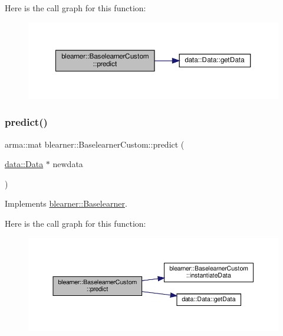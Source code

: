 Here is the call graph for this function\+:
\nopagebreak
\begin{figure}[H]
\begin{center}
\leavevmode
\includegraphics[width=350pt]{classblearner_1_1_baselearner_custom_a7d9640dbb9a118b77735cf79a5850652_cgraph}
\end{center}
\end{figure}
\mbox{\label{classblearner_1_1_baselearner_custom_aeeb3a3934b94f095bfe689cff385dfa7}} 
\subsubsection{\texorpdfstring{predict()}{predict()}\hspace{0.1cm}{\footnotesize\ttfamily [2/2]}}
{\footnotesize\ttfamily arma\+::mat blearner\+::\+Baselearner\+Custom\+::predict (\begin{DoxyParamCaption}\item[{\hyperlink{classdata_1_1_data}{data\+::\+Data} $\ast$}]{newdata }\end{DoxyParamCaption})\hspace{0.3cm}{\ttfamily [virtual]}}



Implements \hyperlink{classblearner_1_1_baselearner_ae2ef5e018783578e02b3b5a33fa94eae}{blearner\+::\+Baselearner}.

Here is the call graph for this function\+:
\nopagebreak
\begin{figure}[H]
\begin{center}
\leavevmode
\includegraphics[width=350pt]{classblearner_1_1_baselearner_custom_aeeb3a3934b94f095bfe689cff385dfa7_cgraph}
\end{center}
\end{figure}
\mbox{\label{classblearner_1_1_baselearner_custom_a31e3921f86f267d36135d07bf1d16551}} 
